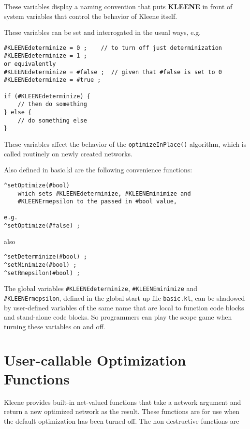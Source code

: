 \noindent
These variables display a naming convention that puts \textbf{KLEENE} in front
of system variables that control the behavior of Kleene itself.

These variables can be set and interrogated in the usual ways, e.g.

\begin{Verbatim}[fontsize=\small]
#KLEENEdeterminize = 0 ;	// to turn off just determinization
#KLEENEdeterminize = 1 ;
or equivalently
#KLEENEdeterminize = #false ;  // given that #false is set to 0
#KLEENEdeterminize = #true ;

if (#KLEENEdeterminize) {
    // then do something
} else {
    // do something else
}
\end{Verbatim}

\noindent 
These variables affect the behavior of the \texttt{optimizeInPlace()}
algorithm, which is called routinely on newly created networks.

Also defined in basic.kl are the following convenience functions:

\begin{Verbatim}[fontsize=\small]
^setOptimize(#bool)
	which sets #KLEENEdeterminize, #KLEENEminimize and
	#KLEENErmepsilon to the passed in #bool value, 
	
e.g.
^setOptimize(#false) ;
\end{Verbatim}

\noindent
also

\begin{Verbatim}[fontsize=\small]
^setDeterminize(#bool) ;
^setMinimize(#bool) ;
^setRmepsilon(#bool) ;
\end{Verbatim}

The global variables \verb!#KLEENEdeterminize!, \verb!#KLEENEminimize!
and \verb!#KLEENErmepsilon!, defined in the global start-up file
\texttt{basic.kl}, can be shadowed by user-defined variables of the same
name that are local to function code blocks and stand-alone code blocks.
So programmers can play the scope game when turning these variables on
and off.

\section{User-callable Optimization Functions}

Kleene provides built-in net-valued functions that take a network
argument and return a new optimized network as the result.  These
functions are for use when the default optimization has been turned off.
The non-destructive functions are

